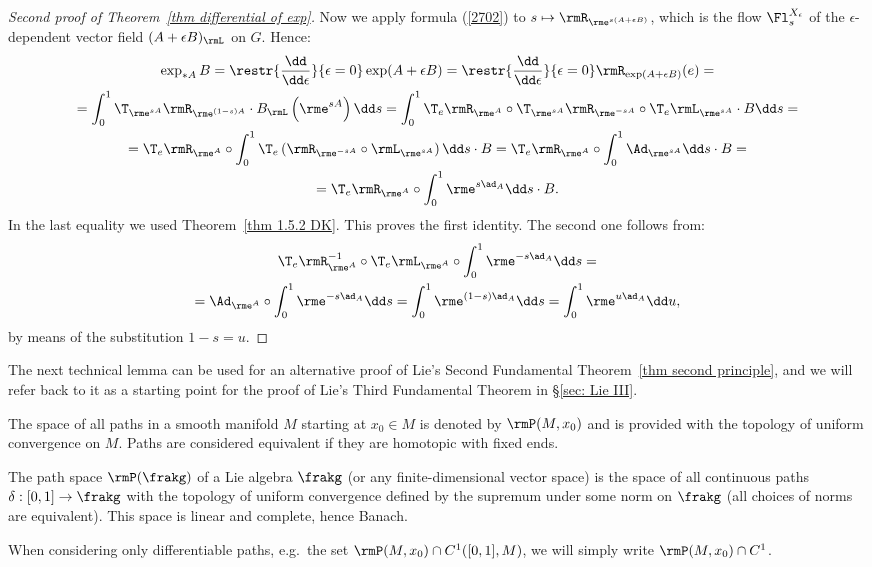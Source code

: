 \begin{proof}[Second proof of Theorem~\ref{thm differential of exp}]
    Now we apply formula (\ref{2702}) to $s\mapsto \rmR_{\rme^{s(A+\epsilon B)}}$, which is the flow $\Fl^{X_\epsilon}_s$ of the $\epsilon$-dependent vector field $(A+\epsilon B)_\rmL$ on $G$. Hence:
    \begin{multline}
        \exp_{\ast A}B=\restr{\frac{\dd}{\dd \epsilon}}{\epsilon=0}\exp(A+\epsilon B)=\restr{\frac{\dd}{\dd \epsilon}}{\epsilon=0}\rmR_{\exp(A+\epsilon B)}(e)=\\
        =\int_0^1\T_{\rme^{sA}}\rmR_{\rme^{(1-s)A}}\cdot B_\rmL\left(\rme^{sA}\right)\dd s=
        \int_0^1 \T_e \rmR_{\rme^A}\circ \T_{\rme^{sA}}\rmR_{\rme^{-sA}}\circ \T_e \rmL_{\rme^{sA}}\cdot B \dd s=\\
        =\T_e \rmR_{\rme^A}\circ\int_0^1 \T_e\left(\rmR_{\rme^{-sA}}\circ \rmL_{\rme^{sA}}\right)\dd s \cdot B=
        \T_e \rmR_{\rme^A}\circ \int_0^1 \Ad_{\rme^{sA}}\dd s\cdot B=\\
        =\T_e\rmR_{\rme^A}\circ \int_0^1 \rme^{s\ad_A}\dd s\cdot B.
    \end{multline}
    In the last equality we used Theorem~\ref{thm 1.5.2 DK}. This proves the first identity. The second one follows from:
    \begin{multline}
        \T_e \rmR_{\rme^A}^{-1}\circ \T_e\rmL_{\rme^A}\circ \int_0^1 \rme^{-s\ad_A}\dd s=\\
        =\Ad_{\rme^A}\circ\int_0^1 \rme^{-s\ad_A}\dd s=\int_0^1 \rme^{(1-s)\ad_A}\dd s=\int_0^1 \rme^{u\ad_A}\dd u,
    \end{multline}
    by means of the substitution $1-s=u$.
\end{proof}

The next technical lemma can be used for an alternative proof of Lie's Second Fundamental Theorem~\ref{thm second principle}, and we will refer back to it as a starting point for the proof of Lie's Third Fundamental Theorem in \S\ref{sec: Lie III}.

\begin{defn}
    The space of all paths in a smooth manifold $M$ starting at $x_0\in M$ is denoted by $\rmP(M,x_0)$ and is provided with the topology of uniform convergence on $M$. Paths are considered equivalent if they are homotopic with fixed ends.

    The path space $\rmP(\frakg)$ of a Lie algebra $\frakg$ (or any finite-dimensional vector space) is the space of all continuous paths $\delta:[0,1]\to \frakg$ with the topology of uniform convergence defined by the supremum under some norm on $\frakg$ (all choices of norms are equivalent). This space is linear and complete, hence Banach.

    When considering only differentiable paths, e.g.~the set $\rmP(M,x_0)\cap C^1([0,1],M)$, we will simply write $\rmP(M,x_0)\cap C^1$. 
\end{defn}

